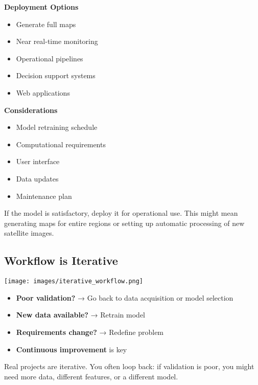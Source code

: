 \documentclass[
  letterpaper,
  DIV=11,
  numbers=noendperiod]{scrartcl}
\providecommand{\tightlist}{%
  \setlength{\itemsep}{0pt}\setlength{\parskip}{0pt}}
\begin{document}
\textbf{Deployment Options}

\begin{itemize}
\tightlist
\item
  Generate full maps
\item
  Near real-time monitoring
\item
  Operational pipelines
\item
  Decision support systems
\item
  Web applications
\end{itemize}

\textbf{Considerations}

\begin{itemize}
\tightlist
\item
  Model retraining schedule
\item
  Computational requirements
\item
  User interface
\item
  Data updates
\item
  Maintenance plan
\end{itemize}

If the model is satisfactory, deploy it for operational use. This might
mean generating maps for entire regions or setting up automatic
processing of new satellite images.

\subsection{Workflow is Iterative}\label{workflow-is-iterative}

\begin{center}
\texttt{[image: images/iterative\_workflow.png]}
\end{center}

\begin{itemize}
\tightlist
\item
  \textbf{Poor validation?} → Go back to data acquisition or model
  selection
\item
  \textbf{New data available?} → Retrain model
\item
  \textbf{Requirements change?} → Redefine problem
\item
  \textbf{Continuous improvement} is key
\end{itemize}

Real projects are iterative. You often loop back: if validation is poor,
you might need more data, different features, or a different model.
\end{document}
